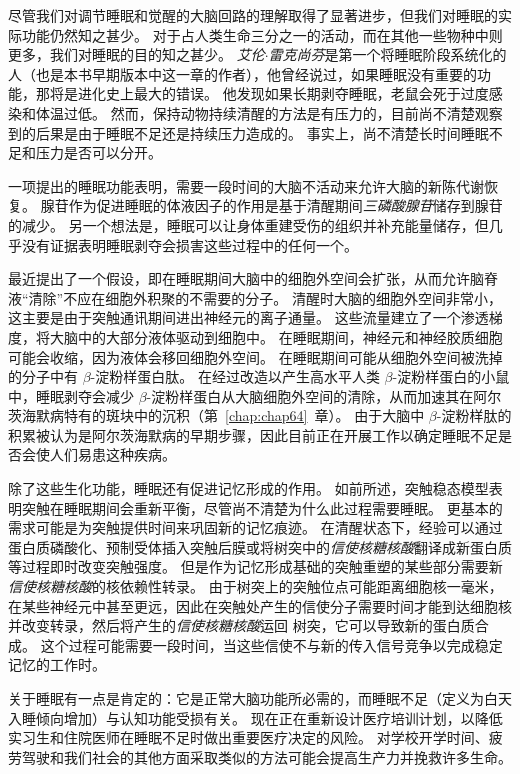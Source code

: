 尽管我们对调节睡眠和觉醒的大脑回路的理解取得了显著进步，但我们对睡眠的实际功能仍然知之甚少。
对于占人类生命三分之一的活动，而在其他一些物种中则更多，我们对睡眠的目的知之甚少。
\textit{艾伦$\cdot$雷克尚芬}是第一个将睡眠阶段系统化的人（也是本书早期版本中这一章的作者），他曾经说过，如果睡眠没有重要的功能，那将是进化史上最大的错误。
他发现如果长期剥夺睡眠，老鼠会死于过度感染和体温过低。
然而，保持动物持续清醒的方法是有压力的，目前尚不清楚观察到的后果是由于睡眠不足还是持续压力造成的。
事实上，尚不清楚长时间睡眠不足和压力是否可以分开。


一项提出的睡眠功能表明，需要一段时间的大脑不活动来允许大脑的新陈代谢恢复。
腺苷作为促进睡眠的体液因子的作用是基于清醒期间\textit{三磷酸腺苷}储存到腺苷的减少。
另一个想法是，睡眠可以让身体重建受伤的组织并补充能量储存，但几乎没有证据表明睡眠剥夺会损害这些过程中的任何一个。


最近提出了一个假设，即在睡眠期间大脑中的细胞外空间会扩张，从而允许脑脊液“清除”不应在细胞外积聚的不需要的分子。
清醒时大脑的细胞外空间非常小，这主要是由于突触通讯期间进出神经元的离子通量。
这些流量建立了一个渗透梯度，将大脑中的大部分液体驱动到细胞中。
在睡眠期间，神经元和神经胶质细胞可能会收缩，因为液体会移回细胞外空间。
在睡眠期间可能从细胞外空间被洗掉的分子中有 $ \beta $-淀粉样蛋白肽。
在经过改造以产生高水平人类 $ \beta $-淀粉样蛋白的小鼠中，睡眠剥夺会减少 $ \beta $-淀粉样蛋白从大脑细胞外空间的清除，从而加速其在阿尔茨海默病特有的斑块中的沉积（第~\ref{chap:chap64}~章）。
由于大脑中 $ \beta $-淀粉样肽的积累被认为是阿尔茨海默病的早期步骤，因此目前正在开展工作以确定睡眠不足是否会使人们易患这种疾病。


除了这些生化功能，睡眠还有促进记忆形成的作用。
如前所述，突触稳态模型表明突触在睡眠期间会重新平衡，尽管尚不清楚为什么此过程需要睡眠。
更基本的需求可能是为突触提供时间来巩固新的记忆痕迹。
在清醒状态下，经验可以通过蛋白质磷酸化、预制受体插入突触后膜或将树突中的\textit{信使核糖核酸}翻译成新蛋白质等过程即时改变突触强度。
但是作为记忆形成基础的突触重塑的某些部分需要新\textit{信使核糖核酸}的核依赖性转录。
由于树突上的突触位点可能距离细胞核一毫米，在某些神经元中甚至更远，因此在突触处产生的信使分子需要时间才能到达细胞核并改变转录，然后将产生的\textit{信使核糖核酸}运回 树突，它可以导致新的蛋白质合成。
这个过程可能需要一段时间，当这些信使不与新的传入信号竞争以完成稳定记忆的工作时。


关于睡眠有一点是肯定的：它是正常大脑功能所必需的，而睡眠不足（定义为白天入睡倾向增加）与认知功能受损有关。
现在正在重新设计医疗培训计划，以降低实习生和住院医师在睡眠不足时做出重要医疗决定的风险。
对学校开学时间、疲劳驾驶和我们社会的其他方面采取类似的方法可能会提高生产力并挽救许多生命。



